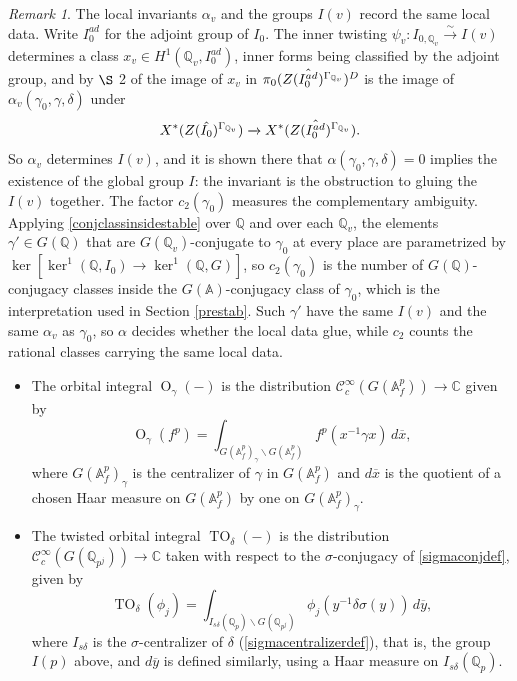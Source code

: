 \documentclass[11pt,a4paper]{article}
\theoremstyle{definition}
\theoremstyle{plain}
\theoremstyle{remark}
\newtheorem{R}[shared]{Remark}
\theoremstyle{plain}
\DeclareMathOperator{\Or}{O}
\DeclareMathOperator{\TO}{TO}
\begin{document}
\begin{R}\label{alphaIv}
    The local invariants $\alpha_v$ and the groups $I(v)$ record the same local data. Write $I_0^{ad}$ for the adjoint group of $I_0$. The inner twisting $\psi_v : I_{0,\mathbb{Q}_v} \xrightarrow{\sim} I(v)$ determines a class $x_v \in H^1(\mathbb{Q}_v, I_0^{ad})$, inner forms being classified by the adjoint group, and by $\S$ 2 of \cite{MR1044820} the image of $x_v$ in $\pi_0(Z(\Hat{I_0^{ad}})^{\Gamma_{\mathbb{Q}_v}})^D$ is the image of $\alpha_v(\gamma_0, \gamma, \delta)$ under
    $$X^*(Z(\Hat{I_0})^{\Gamma_{\mathbb{Q}_v}}) \xrightarrow[]{} X^*(Z(\Hat{I_0^{ad}})^{\Gamma_{\mathbb{Q}_v}}).$$
    So $\alpha_v$ determines $I(v)$, and it is shown there that $\alpha(\gamma_0, \gamma, \delta) = 0$ implies the existence of the global group $I$: the invariant is the obstruction to gluing the $I(v)$ together. The factor $c_2(\gamma_0)$ measures the complementary ambiguity. Applying \ref{conjclassinsidestable} over $\mathbb{Q}$ and over each $\mathbb{Q}_v$, the elements $\gamma' \in G(\mathbb{Q})$ that are $G(\mathbb{Q}_v)$-conjugate to $\gamma_0$ at every place are parametrized by $\ker[\ker^1(\mathbb{Q}, I_0) \xrightarrow[]{} \ker^1(\mathbb{Q}, G)]$, so $c_2(\gamma_0)$ is the number of $G(\mathbb{Q})$-conjugacy classes inside the $G(\mathbb{A})$-conjugacy class of $\gamma_0$, which is the interpretation used in Section \ref{prestab}. Such $\gamma'$ have the same $I(v)$ and the same $\alpha_v$ as $\gamma_0$, so $\alpha$ decides whether the local data glue, while $c_2$ counts the rational classes carrying the same local data.
\end{R}

\begin{itemize}
    \item The orbital integral $\Or_{\gamma}(-)$ is the distribution $\mathcal{C}_c^{\infty}(G(\mathbb{A}_f^p)) \xrightarrow[]{} \mathbb{C}$ given by
    $$\Or_{\gamma}(f^p) = \int_{G(\mathbb{A}_f^p)_{\gamma} \backslash G(\mathbb{A}_f^p)} f^p(x^{-1} \gamma x) \, d\overline{x},$$
    where $G(\mathbb{A}_f^p)_{\gamma}$ is the centralizer of $\gamma$ in $G(\mathbb{A}_f^p)$ and $d\overline{x}$ is the quotient of a chosen Haar measure on $G(\mathbb{A}_f^p)$ by one on $G(\mathbb{A}_f^p)_{\gamma}$.
    \item The twisted orbital integral $\TO_{\delta}(-)$ is the distribution $\mathcal{C}^{\infty}_c(G(\mathbb{Q}_{p^j})) \xrightarrow[]{} \mathbb{C}$ taken with respect to the $\sigma$-conjugacy of \ref{sigmaconjdef}, given by
    $$\TO_{\delta}(\phi_j) = \int_{I_{s\delta}(\mathbb{Q}_p) \backslash G(\mathbb{Q}_{p^j})} \phi_j(y^{-1} \delta \sigma(y)) \, d\overline{y},$$
    where $I_{s\delta}$ is the $\sigma$-centralizer of $\delta$ (\ref{sigmacentralizerdef}), that is, the group $I(p)$ above, and $d\overline{y}$ is defined similarly, using a Haar measure on $I_{s\delta}(\mathbb{Q}_p)$.
\end{itemize}
\end{document}
